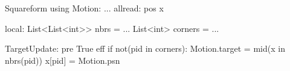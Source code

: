 Squareform
  using Motion:
   ...
  allread:
    pos x$\label{shapeformp}$

  local:
    List<List<int>> nbrs = ...
    List<int> corners = ...
  
  TargetUpdate:
    pre True
    eff if not(pid in corners):
      Motion.target = mid(x in nbrs(pid))
      x[pid] = Motion.psn

    
